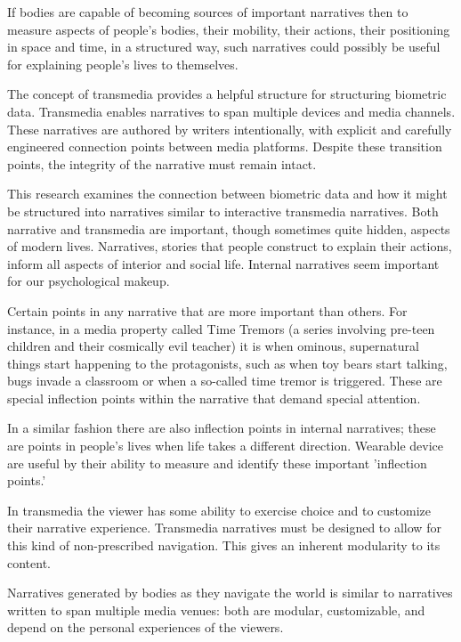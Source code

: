 \documentclass{SIGCHI2015LaTex/sigchi}
\begin{document}
If bodies are capable of becoming sources of important narratives then to measure aspects of people's bodies, their mobility, their actions, their positioning in space and time, in a structured way, such narratives could possibly be useful for explaining people's lives to themselves.

The concept of transmedia provides a helpful structure for structuring biometric data. Transmedia enables narratives to span multiple devices and media channels. These narratives are authored by writers intentionally, with explicit and carefully engineered connection points between media platforms. Despite these transition points, the integrity of the narrative must remain intact. 

This research examines the connection between biometric data and how it might be structured into narratives similar to interactive transmedia narratives. 
Both narrative and transmedia are important, though sometimes quite hidden, aspects of modern lives. Narratives, stories that people construct to explain their actions, inform all aspects of interior and social life. Internal narratives seem important for our psychological makeup. 

Certain points in any narrative that are more important than others. For instance, in a media property called Time Tremors (a series involving pre-teen children and their cosmically evil teacher) it is when ominous, supernatural things start happening to the protagonists, such as when toy bears start talking, bugs invade a classroom or when a so-called time tremor is triggered. These are special inflection points within the narrative that demand special attention. 

In a similar fashion there are also inflection points in internal narratives; these are points in people's lives when life takes a different direction. Wearable device are useful by their ability to measure and identify these important 'inflection points.'

In transmedia the viewer has some ability to exercise choice and to customize their narrative experience. Transmedia narratives must be designed to allow for this kind of non-prescribed navigation. This gives an inherent modularity to its content.

Narratives generated by bodies as they navigate the world is similar to narratives written to span multiple media venues: both are modular, customizable, and depend on the personal experiences of the viewers. 

%
\end{document}
